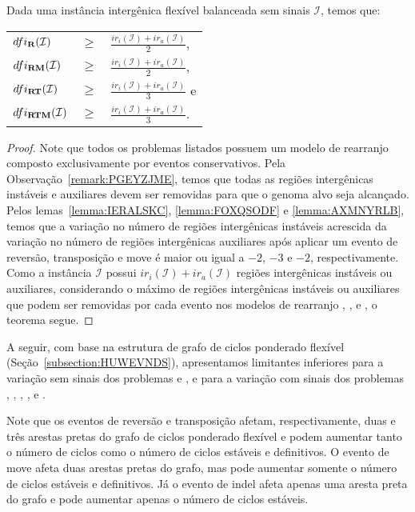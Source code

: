 \begin{theorem}\label{theorem:KKKUCDHN}
Dada uma instância intergênica flexível balanceada sem sinais $\mathcal{I}$, temos que:

\begin{tabular}{lll}
  $dfi_{\textbf{R}}(\mathcal{I})$      & $ \ge $ & $\frac{ir_i(\mathcal{I}) + ir_a(\mathcal{I})}{2}$,  \\ 
  $dfi_{\textbf{RM}}(\mathcal{I})$     & $ \ge $ & $\frac{ir_i(\mathcal{I}) + ir_a(\mathcal{I})}{2}$,  \\
  $dfi_{\textbf{RT}}(\mathcal{I})$     & $ \ge $ & $\frac{ir_i(\mathcal{I}) + ir_a(\mathcal{I})}{3}$ e \\
  $dfi_{\textbf{RTM}}(\mathcal{I})$    & $ \ge $ & $\frac{ir_i(\mathcal{I}) + ir_a(\mathcal{I})}{3}$.  \\
\end{tabular}
\end{theorem}
\begin{proof}
Note que todos os problemas listados possuem um modelo de rearranjo composto exclusivamente por eventos conservativos. Pela Observação~\ref{remark:PGEYZJME}, temos que todas as regiões intergênicas instáveis e auxiliares devem ser removidas para que o genoma alvo seja alcançado. Pelos lemas~\ref{lemma:IERALSKC}, \ref{lemma:FOXQSODF} e \ref{lemma:AXMNYRLB}, temos que a variação no número de regiões intergênicas instáveis acrescida da variação no número de regiões intergênicas auxiliares após aplicar um evento de reversão, transposição e move é maior ou igual a $-2$, $-3$ e $-2$, respectivamente. Como a instância $\mathcal{I}$ possui $ir_i(\mathcal{I}) + ir_a(\mathcal{I})$ regiões intergênicas instáveis ou auxiliares, considerando o máximo de regiões intergênicas instáveis ou auxiliares que podem ser removidas por cada evento nos modelos de rearranjo \R{}, \RM{}, \RT{} e \RTM{}, o teorema segue.
\end{proof}

A seguir, com base na estrutura de grafo de ciclos ponderado flexível (Seção~\ref{subsection:HUWEVNDS}), apresentamos limitantes inferiores para a variação sem sinais dos problemas \SbFIT{} e \SbFITM{}, e para a variação com sinais dos problemas \SbFIR{}, \SbFIRI{}, \SbFIRM{}, \break\SbFIRMI{}, \SbFIRT{} e \SbFIRTM{}.

Note que os eventos de reversão e transposição afetam, respectivamente, duas e três arestas pretas do grafo de ciclos ponderado flexível e podem aumentar tanto o número de ciclos como o número de ciclos estáveis e definitivos. O evento de move afeta duas arestas pretas do grafo, mas pode aumentar somente o número de ciclos estáveis e definitivos. Já o evento de indel afeta apenas uma aresta preta do grafo e pode aumentar apenas o número de ciclos estáveis.

